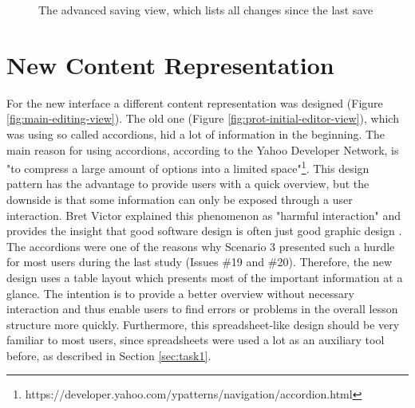 \begin{figure}[hp!]
 \centering
 \caption{The advanced saving view, which lists all changes since the last save}
 \label{fig:save-changes}
\end{figure}

\section{New Content Representation}
For the new interface a different content representation was designed (Figure \ref{fig:main-editing-view}). The old one (Figure \ref{fig:prot-initial-editor-view}), which was using so called accordions, hid a lot of information in the beginning. The main reason for using accordions, according to the Yahoo Developer Network, is "to compress a large amount of options into a limited space"\footnote{https://developer.yahoo.com/ypatterns/navigation/accordion.html}. This design pattern has the advantage to provide users with a quick overview, but the downside is that some information can only be exposed through a user interaction. Bret Victor explained this phenomenon as "harmful interaction" and provides the insight that good software design is often just good graphic design \cite{victor_magic_2006}. The accordions were one of the reasons why Scenario 3 presented such a hurdle for most users during the last study (Issues \#19 and \#20). Therefore, the new design uses a table layout which presents most of the important information at a glance. The intention is to provide a better overview without necessary interaction and thus enable users to find errors or problems in the overall lesson structure more quickly. Furthermore, this spreadsheet-like design should be very familiar to most users, since spreadsheets were used a lot as an auxiliary tool before, as described in Section \ref{sec:task1}.


